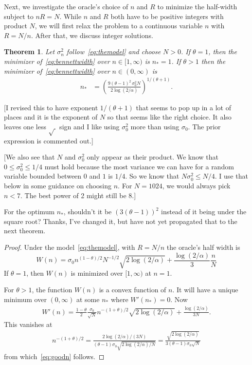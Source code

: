 \documentclass{article}
\newtheorem{theorem}{Theorem}
\newcommand{\art}[1]{\begingroup\color{blue}#1\endgroup}
\newcommand{\aadit}[1]{\begingroup\color{orange}#1\endgroup}
\renewcommand{\le}{\leqslant}
\begin{document}
Next, we investigate the oracle's choice of $n$ and $R$
to minimize the half-width subject to $nR=N$. 
While $n$ and $R$ both have to be positive integers
with product $N$, we will first relax the problem
to a continuous variable $n$ with $R=N/n$.  After that, we
discuss integer solutions.

\begin{theorem}\label{thm:goodn}
Let $\sigma^2_n$ follow~\eqref{eq:themodel} and choose $N>0$.
If $\theta=1$, then the minimizer of~\eqref{eq:bennettwidth} 
over $n\in[1,\infty)$ is $n_*=1$.
If $\theta>1$ then the minimizer of~\eqref{eq:bennettwidth}
over $n\in(0,\infty)$ is 
\begin{align}\label{eq:goodn}
n_*& 
 = 
\left(\frac{9(\theta-1)^2\,\sigma_0^2
N}{2\log(2/\alpha)}\right)^{1/(\theta+1)}.
\end{align}\end{theorem}
\art{[I revised this to have exponent $1/(\theta+1)$
that seems to pop up in a lot of places and it is the
exponent of $N$ so that seems like the right choice. It also
leaves one less $\sqrt{\ }$ sign and I like using $\sigma_0^2$ more
than using $\sigma_0$. The prior expression is commented out.]} 

\art{[We also see that $N$ and $\sigma^2_0$ only appear
as their product.  We know that $0\le\sigma_0^2\le1/4$ must hold because
the most variance we can have for a random variable bounded between
$0$ and $1$ is $1/4$. So we know that $N\sigma_0^2\le N/4$. I use that
below in some guidance on choosing $n$. For $N=1024$, we would
always pick $n<7$. The best power of 2 might still be $8$.]}

\aadit{For the optimum $n_*$, shouldn't it be $(3(\theta - 1))^2$ instead of it being under the square root?}
\art{Thanks, I've changed it, but have not yet propagated that to the
next theorem.}

\begin{proof}
Under the model~\eqref{eq:themodel}, with $R=N/n$
the oracle's half width is
$$
W(n)=\sigma_0n^{(1-\theta)/2}N^{-1/2}
\sqrt{2\log(2/\alpha)}
+\frac{\log(2/\alpha)}{3}\frac{n}N
$$
If $\theta=1$, then $W(n)$ is minimized over $[1,\infty)$ at $n=1$.

For $\theta>1$, the function $W(n)$ is a convex function of $n$.
It will have a unique minimum over $(0,\infty)$ at
some $n_*$ where $W'(n_*)=0$. Now
\begin{align*}
W'(n)=\frac{1-\theta}2\frac{\sigma_0}{\sqrt{N}}n^{-(1+\theta)/2}
\sqrt{2\log(2/\alpha)}  + \frac{\log(2/\alpha)}{3N}.
\end{align*}
This vanishes at 
\begin{align*}
n^{-(1+\theta)/2} = 
\frac{2\log(2/\alpha)/(3N)}
{(\theta-1)\sigma_0
\sqrt{2\log(2/\alpha)/N}}=
\frac{\sqrt{2\log(2/\alpha)}}
{3(\theta-1)\sigma_0
\sqrt{N}}
\end{align*}
from which~\eqref{eq:goodn} follows.
\end{proof}
\end{document}
